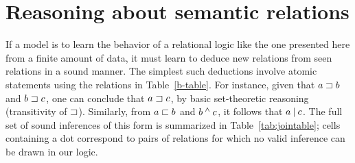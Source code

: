 \section{Reasoning about semantic relations}\label{sec:join}

If a model is to learn the behavior of a relational logic like the one
presented here from a finite amount of data, it must learn to deduce new
relations from seen relations in a sound manner. The simplest such
deductions involve atomic statements using the relations in
Table~\ref{b-table}. For instance, given that $a \sqsupset b$ and $b
\sqsupset c$, one can conclude that $a \sqsupset c$, by basic
set-theoretic reasoning (transitivity of $\sqsupset$). Similarly, from
$a \sqsubset b$ and $b \mathbin{^{\wedge}} c$, it follows that $a \mathbin{|} c$.  The
full set of sound inferences of this form is summarized in
Table~\ref{tab:jointable}; cells containing a dot correspond to pairs
of relations for which no valid inference can be drawn in our logic.


